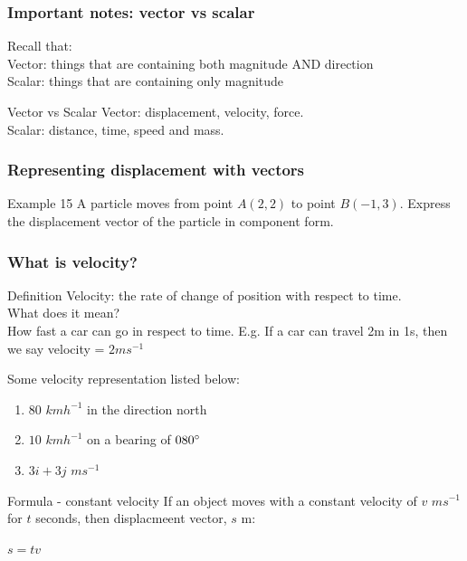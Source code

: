 \documentclass[
	11pt, %
]{beamer}
\begin{document}
\begin{frame}
    \frametitle{Important notes: vector vs scalar}
    Recall that:\\
    Vector: things that are containing both magnitude AND direction\\
    Scalar: things that are containing only magnitude\\
    \begin{block}{Vector vs Scalar}
        Vector: displacement, velocity, force.\\
        Scalar: distance, time, speed and mass.
    \end{block}
\end{frame}

\begin{frame}[t]
    \frametitle{Representing displacement with vectors} 
    \begin{block}{Example 15}
        A particle moves from point $A(2,2)$ to point $B(-1,3)$. Express the displacement vector of the particle in component form.
    \end{block}
\end{frame}

\begin{frame}
    \frametitle{What is velocity?} 
    \begin{block}{Definition}
        Velocity: the rate of change of position with respect to time.\\
        What does it mean?\\
        How fast a car can go in respect to time. E.g. If a car can travel 2m in 1s, then we say velocity = $2ms^{-1}$
    \end{block}
    Some velocity representation listed below:\\
    \begin{enumerate}
        \item $80$ $kmh^{-1}$ in the direction north
        \item $10$ $kmh^{-1}$ on a bearing of $080\degree$
        \item $3i + 3j$ $ms^{-1}$
    \end{enumerate}
    \begin{block}{Formula - constant velocity}
        If an object moves with a constant velocity of $v$ $ms^{-1}$ for $t$ seconds, then displacmeent vector, $s$ m:\\
        \begin{center}
            $s = tv$
        \end{center}
    \end{block}
\end{frame}
\end{document}
